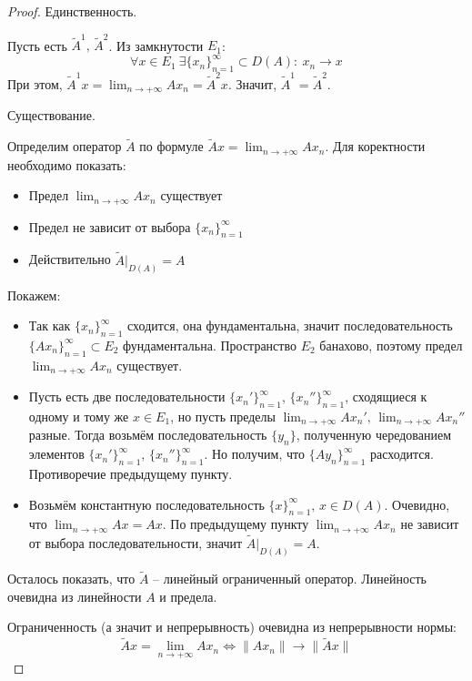 \documentclass[a4paper,12pt]{article}
\theoremstyle{plain}
\theoremstyle{definition}
\theoremstyle{remark}
\begin{document}
\begin{proof}
	Единственность.

	Пусть есть $\tilde{A}^1,\, \tilde{A}^2$. Из замкнутости $E_1$:
	\[
		\forall x \in E_1 \: \exists\{x_n\}_{n = 1}^\infty \subset D(A) :\: x_n \to x
	\]
	При этом, $\tilde{A}^1x = \lim_{n \to +\infty}Ax_n = \tilde{A}^2x$. Значит, $\tilde{A}^1 = \tilde{A}^2$.

	Существование.

	Определим оператор $\tilde{A}$ по формуле $\tilde{A}x = \lim_{n \to +\infty}Ax_n$. Для коректности необходимо показать:
	\begin{itemize}
		\item Предел $\lim_{n \to +\infty}Ax_n$ существует
		\item Предел не зависит от выбора $\{x_n\}_{n = 1}^\infty$
		\item Действительно $\tilde{A}|_{D(A)} = A$
	\end{itemize}

	Покажем:
	\begin{itemize}
		\item Так как $\{x_n\}_{n = 1}^\infty$ сходится, она фундаментальна, значит последовательность $\{Ax_n\}_{n = 1}^\infty \subset E_2$ фундаментальна. Пространство $E_2$ банахово, поэтому предел $\lim_{n \to +\infty}Ax_n$ существует.
		\item Пусть есть две последовательности $\{x_n'\}_{n=1}^\infty,\, \{x_n''\}_{n=1}^\infty$, сходящиеся к одному и тому же $x \in E_1$, но пусть пределы $\lim_{n \to +\infty} Ax_n',\, \lim_{n \to +\infty}Ax_n''$ разные. Тогда возьмём последовательность $\{y_n\}$, полученную чередованием элементов $\{x_n'\}_{n=1}^\infty,\, \{x_n''\}_{n=1}^\infty$. Но получим, что $\{Ay_n\}_{n=1}^\infty$ расходится. Противоречие предыдущему пункту.
		\item Возьмём константную последовательность $\{x\}_{n = 1}^\infty,\, x \in D(A)$. Очевидно, что $\lim_{n \to +\infty} Ax = Ax$. По предыдущему пункту $\lim_{n \to +\infty} Ax_n$ не зависит от выбора последовательности, значит $\tilde{A}|_{D(A)} = A$.
	\end{itemize}
	Осталось показать, что $\tilde{A}$ -- линейный ограниченный оператор. Линейность очевидна из линейности $A$ и предела.

	Ограниченность (а значит и непрерывность) очевидна из непрерывности нормы:
	\[
		\tilde{A}x = \lim_{n \to +\infty}Ax_n \Leftrightarrow \|Ax_n\| \to \|\tilde{A}x\|
	\]
\end{proof}
\end{document}

